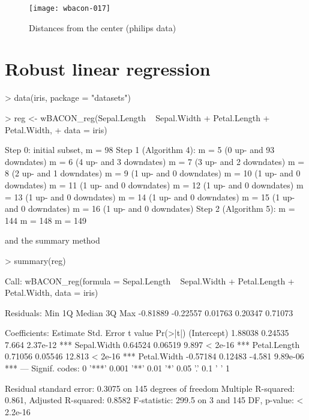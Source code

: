 \documentclass[a4paper,oneside,11pt,DIV=12]{scrartcl}
\begin{document}
\begin{figure}[htb]
\begin{center}
\texttt{[image: wbacon-017]}
\caption{Distances from the center (philips data)}\label{fig:philips_dist}
\end{center}
\end{figure}




\clearpage
\section{Robust linear regression}\label{sec:regression}

\begin{Schunk}
\begin{Sinput}
> data(iris, package = "datasets")
\end{Sinput}
\end{Schunk}


\begin{Schunk}
\begin{Sinput}
> reg <- wBACON_reg(Sepal.Length ~ Sepal.Width + Petal.Length + Petal.Width,
+        data = iris)
\end{Sinput}
\begin{Soutput}
Step 0: initial subset, m = 98
Step 1 (Algorithm 4):
  m = 5 (0 up- and 93 downdates)
  m = 6 (4 up- and 3 downdates)
  m = 7 (3 up- and 2 downdates)
  m = 8 (2 up- and 1 downdates)
  m = 9 (1 up- and 0 downdates)
  m = 10 (1 up- and 0 downdates)
  m = 11 (1 up- and 0 downdates)
  m = 12 (1 up- and 0 downdates)
  m = 13 (1 up- and 0 downdates)
  m = 14 (1 up- and 0 downdates)
  m = 15 (1 up- and 0 downdates)
  m = 16 (1 up- and 0 downdates)
Step 2 (Algorithm 5):
  m = 144
  m = 148
  m = 149
\end{Soutput}
\end{Schunk}

\noindent and the summary method

\begin{Schunk}
\begin{Sinput}
> summary(reg)
\end{Sinput}
\begin{Soutput}
Call:
wBACON_reg(formula = Sepal.Length ~ Sepal.Width + Petal.Length + 
    Petal.Width, data = iris)

Residuals:
     Min       1Q   Median       3Q      Max 
-0.81889 -0.22557  0.01763  0.20347  0.71073 

Coefficients:
             Estimate Std. Error t value Pr(>|t|)    
(Intercept)   1.88038    0.24535   7.664 2.37e-12 ***
Sepal.Width   0.64524    0.06519   9.897  < 2e-16 ***
Petal.Length  0.71056    0.05546  12.813  < 2e-16 ***
Petal.Width  -0.57184    0.12483  -4.581 9.89e-06 ***
---
Signif. codes:  0 '***' 0.001 '**' 0.01 '*' 0.05 '.' 0.1 ' ' 1

Residual standard error: 0.3075 on 145 degrees of freedom
Multiple R-squared:  0.861,	Adjusted R-squared:  0.8582 
F-statistic: 299.5 on 3 and 145 DF,  p-value: < 2.2e-16
\end{Soutput}
\end{Schunk}
\end{document}
